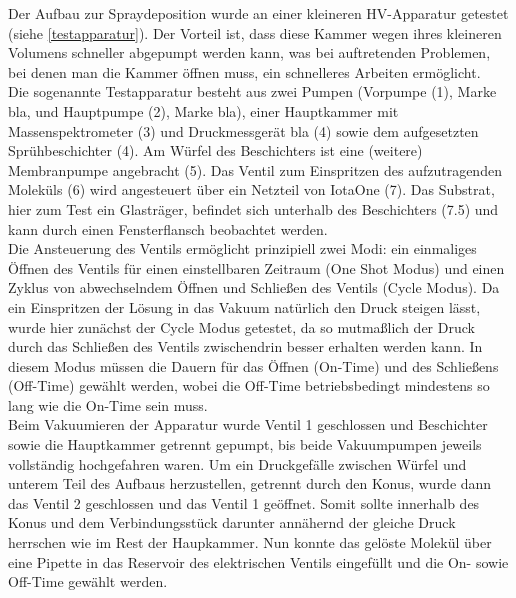 Der Aufbau zur Spraydeposition wurde an einer kleineren HV-Apparatur getestet (siehe \ref{testapparatur}). Der
Vorteil ist, dass diese Kammer wegen ihres kleineren Volumens schneller abgepumpt werden kann, was bei
auftretenden Problemen, bei denen man die Kammer öffnen muss, ein schnelleres Arbeiten ermöglicht.\\
Die sogenannte Testapparatur besteht aus zwei Pumpen (Vorpumpe (1), Marke bla, und Hauptpumpe (2), Marke bla),
einer Hauptkammer mit Massenspektrometer (3) und Druckmessgerät bla (4) sowie dem aufgesetzten
Sprühbeschichter (4). Am Würfel des Beschichters ist eine (weitere) Membranpumpe angebracht (5). Das Ventil
zum Einspritzen des aufzutragenden Moleküls (6) wird angesteuert über ein Netzteil von IotaOne (7). Das
Substrat, hier zum Test ein Glasträger, befindet sich unterhalb des Beschichters (7.5) und kann durch einen
Fensterflansch beobachtet werden.\\
Die Ansteuerung des Ventils ermöglicht
prinzipiell zwei Modi: ein einmaliges Öffnen des
Ventils für einen einstellbaren Zeitraum (One
Shot Modus) und einen Zyklus von abwechselndem
Öffnen und Schließen des Ventils (Cycle Modus).
Da ein Einspritzen der Lösung in das Vakuum
natürlich den Druck steigen lässt, wurde hier
zunächst der Cycle Modus getestet, da so
mutmaßlich der Druck durch das Schließen des
Ventils zwischendrin besser erhalten werden
kann. In diesem Modus müssen die Dauern für das
Öffnen (On-Time) und des Schließens (Off-Time)
gewählt werden, wobei die Off-Time
betriebsbedingt mindestens so lang wie die
On-Time sein muss.\\
Beim Vakuumieren der Apparatur wurde Ventil 1
 geschlossen und Beschichter sowie die 
 Hauptkammer getrennt gepumpt, bis beide
 Vakuumpumpen jeweils vollständig hochgefahren
 waren.
 Um ein Druckgefälle zwischen Würfel und unterem
 Teil des Aufbaus herzustellen, getrennt durch den
 Konus, wurde dann das Ventil 2 geschlossen und
 das Ventil 1 geöffnet.
 Somit sollte innerhalb des Konus und dem
 Verbindungsstück darunter annähernd der gleiche
 Druck herrschen wie im Rest der Haupkammer.
 Nun konnte das gelöste Molekül über eine Pipette
 in das Reservoir des elektrischen Ventils
 eingefüllt und die On- sowie Off-Time gewählt
 werden.\\

